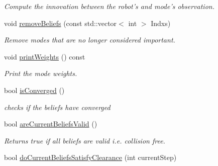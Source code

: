 \begin{DoxyCompactItemize}
\begin{DoxyCompactList}\small\item\em Compute the innovation between the robot's and mode's observation. \end{DoxyCompactList}\item 
\hypertarget{class_n_b_m3_p_a1a66c1007c83f91c73d80ac2b5e7bdbf}{void \hyperlink{class_n_b_m3_p_a1a66c1007c83f91c73d80ac2b5e7bdbf}{remove\-Beliefs} (const std\-::vector$<$ int $>$ Indxs)}\label{class_n_b_m3_p_a1a66c1007c83f91c73d80ac2b5e7bdbf}

\begin{DoxyCompactList}\small\item\em Remove modes that are no longer considered important. \end{DoxyCompactList}\item 
\hypertarget{class_n_b_m3_p_aa84cc4a40728838feb03646ea3fc41bb}{void \hyperlink{class_n_b_m3_p_aa84cc4a40728838feb03646ea3fc41bb}{print\-Weights} () const }\label{class_n_b_m3_p_aa84cc4a40728838feb03646ea3fc41bb}

\begin{DoxyCompactList}\small\item\em Print the mode weights. \end{DoxyCompactList}\item 
\hypertarget{class_n_b_m3_p_abe00e2b04b4c6545ec87eb4d569fa068}{bool \hyperlink{class_n_b_m3_p_abe00e2b04b4c6545ec87eb4d569fa068}{is\-Converged} ()}\label{class_n_b_m3_p_abe00e2b04b4c6545ec87eb4d569fa068}

\begin{DoxyCompactList}\small\item\em checks if the beliefs have converged \end{DoxyCompactList}\item 
\hypertarget{class_n_b_m3_p_a044d5ea04e213cfba2dc959cfa0edb78}{bool \hyperlink{class_n_b_m3_p_a044d5ea04e213cfba2dc959cfa0edb78}{are\-Current\-Beliefs\-Valid} ()}\label{class_n_b_m3_p_a044d5ea04e213cfba2dc959cfa0edb78}

\begin{DoxyCompactList}\small\item\em Returns true if all beliefs are valid i.\-e. collision free. \end{DoxyCompactList}\item 
\hypertarget{class_n_b_m3_p_a238cac66753c87ac21ddea6098b2c744}{bool \hyperlink{class_n_b_m3_p_a238cac66753c87ac21ddea6098b2c744}{do\-Current\-Beliefs\-Satisfy\-Clearance} (int current\-Step)}\label{class_n_b_m3_p_a238cac66753c87ac21ddea6098b2c744}


\end{DoxyCompactItemize}

